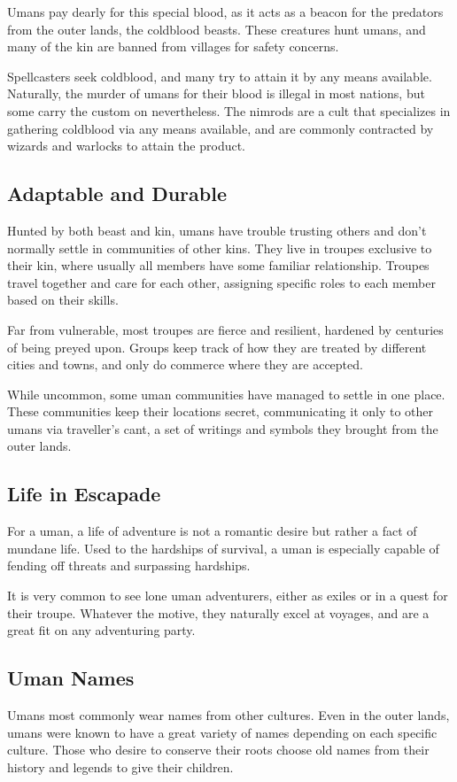 \begin{linenumbers}
Umans pay dearly for this special blood, as it acts as a beacon for the predators from the outer lands, the coldblood beasts.
These creatures hunt umans, and many of the kin are banned from villages for safety concerns.

Spellcasters seek coldblood, and many try to attain it by any means available.
Naturally, the murder of umans for their blood is illegal in most nations, but some carry the custom on nevertheless.
The nimrods are a cult that specializes in gathering coldblood via any means available, and are commonly contracted by wizards and warlocks to attain the product.

\subsection*{Adaptable and Durable}
Hunted by both beast and kin, umans have trouble trusting others and don't normally settle in communities of other kins.
They live in troupes exclusive to their kin, where usually all members have some familiar relationship.
Troupes travel together and care for each other, assigning specific roles to each member based on their skills.

Far from vulnerable, most troupes are fierce and resilient, hardened by centuries of being preyed upon.
Groups keep track of how they are treated by different cities and towns, and only do commerce where they are accepted.

While uncommon, some uman communities have managed to settle in one place.
These communities keep their locations secret, communicating it only to other umans via traveller's cant, a set of writings and symbols they brought from the outer lands.

\subsection*{Life in Escapade}
For a uman, a life of adventure is not a romantic desire but rather a fact of mundane life.
Used to the hardships of survival, a uman is especially capable of fending off threats and surpassing hardships.

It is very common to see lone uman adventurers, either as exiles or in a quest for their troupe.
Whatever the motive, they naturally excel at voyages, and are a great fit on any adventuring party.

\subsection*{Uman Names}
Umans most commonly wear names from other cultures.
Even in the outer lands, umans were known to have a great variety of names depending on each specific culture.
Those who desire to conserve their roots choose old names from their history and legends to give their children.


\end{linenumbers}
